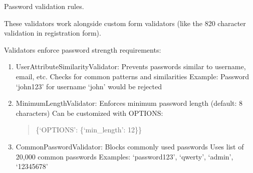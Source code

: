 \documentclass[letterpaper,10pt,english]{sphinxmanual}
\begin{document}

\begin{fulllineitems}
\label{\detokenize{softwareProject:softwareProject.settings.AUTH_PASSWORD_VALIDATORS}}
\pysigstartsignatures
\pysigline
{}
\pysigstopsignatures
\sphinxAtStartPar
Password validation rules.

\sphinxAtStartPar
These validators work alongside custom form validators (like the 8\sphinxhyphen{}20
character validation in registration form).

\sphinxAtStartPar
Validators enforce password strength requirements:
\begin{enumerate}
%
\item {} 
\sphinxAtStartPar
UserAttributeSimilarityValidator:
\sphinxhyphen{} Prevents passwords similar to username, email, etc.
\sphinxhyphen{} Checks for common patterns and similarities
\sphinxhyphen{} Example: Password ‘john123’ for username ‘john’ would be rejected

\item {} 
\sphinxAtStartPar
MinimumLengthValidator:
\sphinxhyphen{} Enforces minimum password length (default: 8 characters)
\sphinxhyphen{} Can be customized with OPTIONS:
\begin{quote}

\sphinxAtStartPar
\{‘OPTIONS’: \{‘min\_length’: 12\}\}
\end{quote}

\item {} 
\sphinxAtStartPar
CommonPasswordValidator:
\sphinxhyphen{} Blocks commonly used passwords
\sphinxhyphen{} Uses list of 20,000 common passwords
\sphinxhyphen{} Examples: ‘password123’, ‘qwerty’, ‘admin’, ‘12345678’


\end{enumerate}
\end{fulllineitems}
\end{document}
